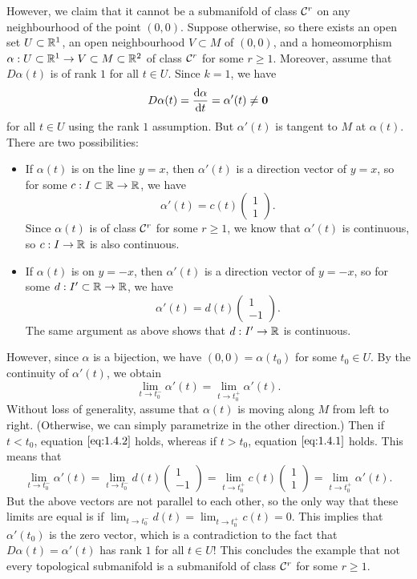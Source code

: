However, we claim that it cannot be a submanifold of 
class ${\cal C}^r$ on any neighbourhood of the point $(0, 0)$. 
Suppose otherwise, so there exists an open set $U \subset \mathbb{R}^1$, 
an open neighbourhood $V \subset M$ of $(0, 0)$, and a homeomorphism 
$\alpha : U \subset \mathbb{R}^1 \to V \subset M \subset \mathbb{R}^2$ of class ${\cal C}^r$ 
for some $r \geq 1$. Moreover, assume that $D\alpha(t)$ is of rank $1$ 
for all $t \in U$. Since $k = 1$, we have 
\[ D\alpha(t) = \frac{{\rm d}\alpha}{{\rm d}t} = \alpha'(t) \neq \mathbf 0 \] 
for all $t \in U$ using the rank $1$ assumption. But $\alpha'(t)$ 
is tangent to $M$ at $\alpha(t)$. There are two possibilities: 
\begin{itemize}
    \item If $\alpha(t)$ is on the line $y = x$, then $\alpha'(t)$ 
    is a direction vector of $y = x$, so for some $c : I 
    \subset \mathbb{R} \to \mathbb{R}$, we have 
    \[ \alpha'(t) = c(t) \begin{pmatrix} 1 \\ 1 \end{pmatrix}. \tag{1.4.1} \label{eq:1.4.1}\] 
    Since $\alpha(t)$ is of class ${\cal C}^r$ for some $r \geq 1$, we know that 
    $\alpha'(t)$ is continuous, so $c : I \to \mathbb{R}$ is also continuous.
    \item If $\alpha(t)$ is on $y = -x$, then $\alpha'(t)$ is a 
    direction vector of $y = -x$, so for some $d : I' \subset \mathbb{R} \to \mathbb{R}$, 
    we have 
    \[ \alpha'(t) = d(t) \begin{pmatrix} 1 \\ -1 \end{pmatrix}. \tag{1.4.2} \label{eq:1.4.2} \] 
    The same argument as above shows that $d : I' \to \mathbb{R}$ is continuous.
\end{itemize}
However, since $\alpha$ is a bijection, we have $(0, 0) = \alpha(t_0)$ 
for some $t_0 \in U$. By the continuity of $\alpha'(t)$, we obtain 
\[ \lim_{t\to t_0^-} \alpha'(t) = \lim_{t\to t_0^+} \alpha'(t). \] 
Without loss of generality, assume that $\alpha(t)$ is moving along $M$ 
from left to right. (Otherwise, we can simply parametrize in the other 
direction.) Then if $t < t_0$, equation $\eqref{eq:1.4.2}$ holds, whereas if 
$t > t_0$, equation $\eqref{eq:1.4.1}$ holds. This means that 
\[ \lim_{t\to t_0^-} \alpha'(t) = \lim_{t\to t_0^-} d(t) \begin{pmatrix} 1 \\ -1 \end{pmatrix} 
= \lim_{t\to t_0^+} c(t) \begin{pmatrix} 1 \\ 1 \end{pmatrix} = \lim_{t\to t_0^+} \alpha'(t). \] 
But the above vectors are not parallel to each other, so the only way that 
these limits are equal is if $\lim_{t\to t_0^-} d(t) = 
\lim_{t\to t_0^+} c(t) = 0$. This implies that $\alpha'(t_0)$ is the zero 
vector, which is a contradiction to the fact that $D\alpha(t) = \alpha'(t)$ 
has rank $1$ for all $t \in U$! This concludes the example that not 
every topological submanifold is a submanifold of class ${\cal C}^r$ for some $r \geq 1$. 

